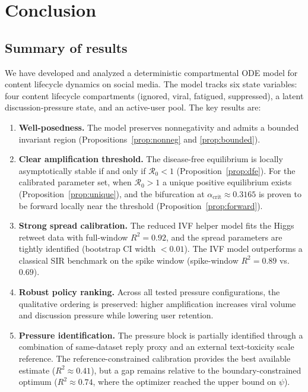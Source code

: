\documentclass[11pt]{article}
\begin{document}
\newpage
\section{Conclusion}
\label{sec:conclusion}

\subsection{Summary of results}

We have developed and analyzed a deterministic compartmental ODE model for content lifecycle dynamics on social media. The model tracks six state variables: four content lifecycle compartments (ignored, viral, fatigued, suppressed), a latent discussion-pressure state, and an active-user pool. The key results are:

\begin{enumerate}[leftmargin=1.5em]
    \item \textbf{Well-posedness.} The model preserves nonnegativity and admits a bounded invariant region (Propositions~\ref{prop:nonneg} and \ref{prop:bounded}).

    \item \textbf{Clear amplification threshold.} The disease-free equilibrium is locally asymptotically stable if and only if $\mathcal{R}_0 < 1$ (Proposition~\ref{prop:dfe}). For the calibrated parameter set, when $\mathcal{R}_0 > 1$ a unique positive equilibrium exists (Proposition~\ref{prop:unique}), and the bifurcation at $\alpha_{\mathrm{crit}} \approx 0.3165$ is proven to be forward locally near the threshold (Proposition~\ref{prop:forward}).

    \item \textbf{Strong spread calibration.} The reduced IVF helper model fits the Higgs retweet data with full-window $R^2 = 0.92$, and the spread parameters are tightly identified (bootstrap CI width $< 0.01$). The IVF model outperforms a classical SIR benchmark on the spike window (spike-window $R^2 = 0.89$ vs.\ $0.69$).

    \item \textbf{Robust policy ranking.} Across all tested pressure configurations, the qualitative ordering is preserved: higher amplification increases viral volume and discussion pressure while lowering user retention.

    \item \textbf{Pressure identification.} The pressure block is partially identified through a combination of same-dataset reply proxy and an external text-toxicity scale reference. The reference-constrained calibration provides the best available estimate ($R^2 \approx 0.41$), but a gap remains relative to the boundary-constrained optimum ($R^2 \approx 0.74$, where the optimizer reached the upper bound on $\psi$).
\end{enumerate}
\end{document}
